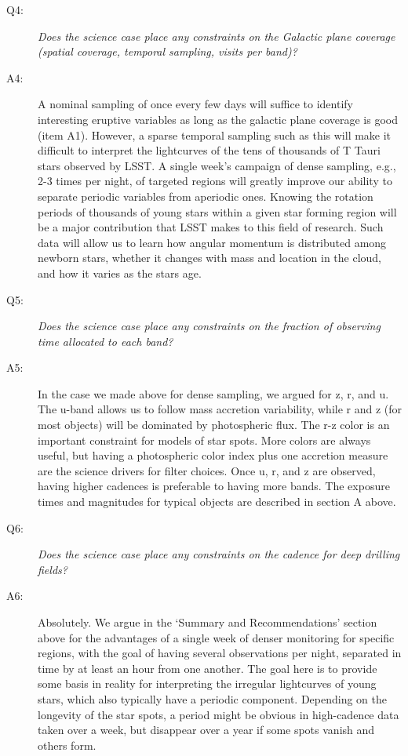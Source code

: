 \begin{description}
\item[Q4:] {\it Does the science case place any constraints on the
Galactic plane coverage (spatial coverage, temporal sampling, visits per
band)?}

\item[A4:] 
A nominal sampling of once every few days will suffice to identify interesting
eruptive variables as long as the galactic plane coverage is good (item A1).
However, a sparse temporal sampling such as this will make it difficult to interpret
the lightcurves of the tens of thousands of T Tauri stars observed by LSST. A single
week's campaign of dense sampling, e.g., 2-3 times per night, of targeted regions
will greatly improve our ability to separate periodic variables from aperiodic ones. 
Knowing the rotation periods of thousands of young stars within a given star forming
region will be a major contribution that LSST makes to this field of research. Such data
will allow us to learn how angular momentum is distributed among newborn
stars, whether it changes with mass and location in the cloud, 
and how it varies as the stars age. 

\item[Q5:] {\it Does the science case place any constraints on the
fraction of observing time allocated to each band?}

\item[A5:] 
In the case we made above for dense sampling, we argued for z, r, and u. The
u-band allows us to follow mass accretion variability, while r and z (for most
objects) will be dominated by photospheric flux. The r-z color is an important
constraint for models of star spots. More colors are always useful, but having
a photospheric color index plus one accretion measure are the science drivers 
for filter choices. Once u, r, and z are observed, having higher cadences
is preferable to having more bands.
The exposure times and magnitudes for typical objects are described in section A
above.

\item[Q6:] {\it Does the science case place any constraints on the
cadence for deep drilling fields?}

\item[A6:] 
Absolutely. We argue in the `Summary and Recommendations' section above
for the advantages of a single week of denser monitoring for specific
regions, with the goal of having several observations per night, separated
in time by at least an hour from one another. The goal here is to provide
some basis in reality for interpreting the irregular lightcurves of young
stars, which also typically have a periodic component. Depending on the longevity of
the star spots, a period might be obvious in high-cadence data taken over
a week, but disappear over a year if some spots vanish and others form. 


\end{description}
